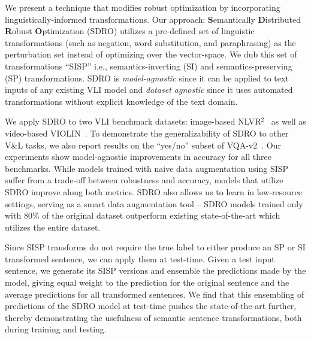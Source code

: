 We present a technique that modifies robust optimization by incorporating linguistically-informed transformations.
Our approach: \textbf{S}emantically \textbf{D}istributed \textbf{R}obust \textbf{O}ptimization (SDRO) 
utilizes a pre-defined set of linguistic transformations (such as negation, word substitution, and paraphrasing) as the perturbation set instead of optimizing over the vector-space.
We dub this set of transformations ``SISP'' i.e., semantics-inverting (SI) and semantics-preserving (SP) transformations.
SDRO is \textit{model-agnostic} since it can be applied to text inputs of any existing VLI model and \textit{dataset agnostic} since it uses automated transformations without explicit knowledge of the text domain.

We apply SDRO to two VLI benchmark datasets: image-based NLVR$^2$~\citep{suhr2019corpus} as well as video-based VIOLIN~\citep{liu2020violin}.
To demonstrate the generalizability of SDRO to other V\&L tasks, we also report results on the ``yes/no'' subset of VQA-v2~\citep{goyal2017making}.
Our experiments show model-agnostic improvements in accuracy for all three benchmarks.
While models trained with naive data augmentation using SISP suffer from a trade-off between robustness and accuracy, models that utilize SDRO improve along both metrics.
SDRO also allows us to learn in low-resource settings, serving as a smart data augmentation tool -- SDRO models trained only with $80\%$ of the original dataset outperform existing state-of-the-art which utilizes the entire dataset.

Since SISP transforms do not require the true label to either produce an SP or SI transformed sentence, we can apply them at test-time.
Given a test input sentence, we generate its SISP versions and ensemble the predictions made by the model, giving equal weight to the prediction for the original sentence and the average predictions for all transformed sentences.
We find that this ensembling of predictions of the SDRO model at test-time pushes the state-of-the-art further, thereby demonstrating the usefulness of semantic sentence transformations, both during training and testing.
